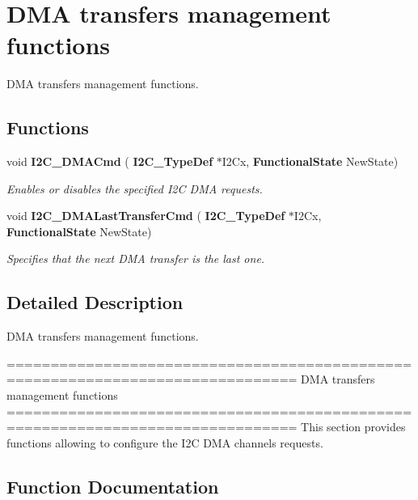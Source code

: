 \section{D\+MA transfers management functions}
\label{group__I2C__Group4}


D\+MA transfers management functions.  


\subsection*{Functions}
\begin{DoxyCompactItemize}
\item 
void \textbf{ I2\+C\+\_\+\+D\+M\+A\+Cmd} (\textbf{ I2\+C\+\_\+\+Type\+Def} $\ast$I2\+Cx, \textbf{ Functional\+State} New\+State)
\begin{DoxyCompactList}\small\item\em Enables or disables the specified I2C D\+MA requests. \end{DoxyCompactList}\item 
void \textbf{ I2\+C\+\_\+\+D\+M\+A\+Last\+Transfer\+Cmd} (\textbf{ I2\+C\+\_\+\+Type\+Def} $\ast$I2\+Cx, \textbf{ Functional\+State} New\+State)
\begin{DoxyCompactList}\small\item\em Specifies that the next D\+MA transfer is the last one. \end{DoxyCompactList}\end{DoxyCompactItemize}


\subsection{Detailed Description}
D\+MA transfers management functions. 

\begin{DoxyVerb} ===============================================================================
                         DMA transfers management functions
 ===============================================================================  
  This section provides functions allowing to configure the I2C DMA channels 
  requests.\end{DoxyVerb}
 

\subsection{Function Documentation}
\mbox{\label{group__I2C__Group4_ga38502ce11e5ec923e0f6476aaa35b45c}} 
